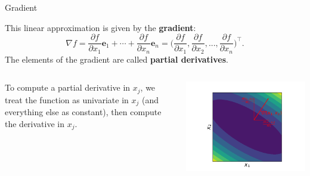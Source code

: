 \documentclass[11pt,compress,t,notes=noshow, xcolor=table]{beamer}
\begin{document}
\begin{vbframe}{Gradient}

This linear approximation is given by the \textbf{gradient}: %
\vspace*{-0.3cm}
$$
\nabla f = \frac{\partial f}{\partial x_1} \bm e_1 + \cdots + \frac{\partial f}{\partial x_n} \bm e_n =
  \biggl(\frac{\partial f}{\partial x_1}, \frac{\partial f}{\partial x_2}, ..., \frac{\partial f}{\partial x_n}\biggr)^{\top}.
$$
The elements of the gradient are called \textbf{partial derivatives}. 

\vspace*{0.3cm}

\begin{columns}
\begin{column}{0.6\textwidth}
\vspace{1cm} \quad 

To compute a partial derivative in $x_j$, we treat the function as univariate in $x_j$ (and everything else as constant), then compute the derivative in $x_j$.
\end{column}
\begin{column}{0.4\textwidth}
\vspace{\topsep}
\includegraphics[width=\columnwidth,trim={2.5cm 0cm 2.0cm 0cm},clip]{figure_man/grad_unit_vectors.png} \\
\end{column}
\end{columns}



\end{vbframe}
\end{document}
